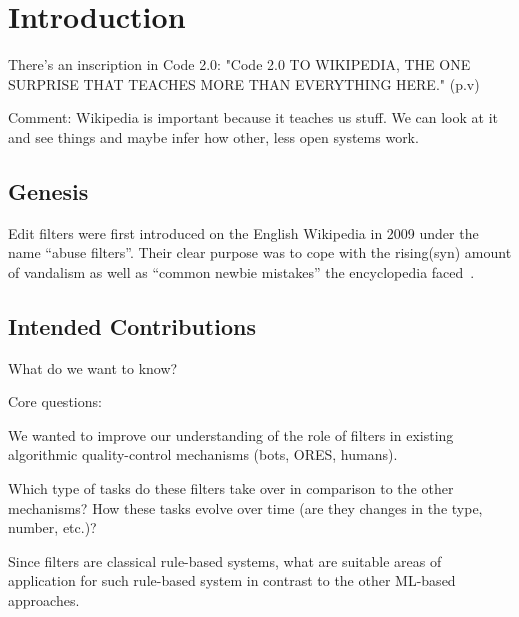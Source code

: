 %
\chapter{Introduction}
\label{chap:introduction}

There's an inscription in Code 2.0:
"Code 2.0
TO WIKIPEDIA, THE ONE SURPRISE THAT TEACHES MORE THAN EVERYTHING HERE." (p.v)~\cite{Lessig2006}

Comment: Wikipedia is important because it teaches us stuff. We can look at it and see things and maybe infer how other, less open systems work.

\section{Genesis}


Edit filters were first introduced on the English Wikipedia in 2009 under the name ``abuse filters''.
Their clear purpose was to cope with the rising(syn) amount of vandalism as well as ``common newbie mistakes'' the encyclopedia faced~\cite{Signpost2009}.



\section{Intended Contributions}

What do we want to know?

Core questions:

We wanted to improve our understanding of the role of filters in existing algorithmic quality-control mechanisms (bots, ORES, humans).

Which type of tasks do these filters take over in comparison to the other mechanisms? How these tasks evolve over time (are they changes in the type, number, etc.)?

Since filters are classical rule-based systems, what are suitable areas of application for such rule-based system in contrast to the other ML-based approaches.


